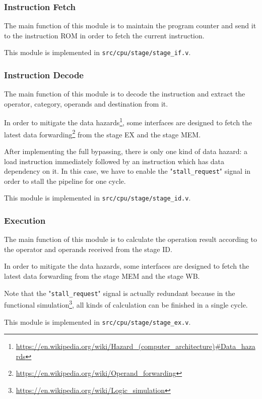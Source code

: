 \documentclass{article}
\begin{document}
\subsubsection{Instruction Fetch}
The main function of this module is to maintain the program counter and send it to the instruction ROM in order to fetch the current instruction.


This module is implemented in \texttt{src/cpu/stage/stage\_if.v}.

\subsubsection{Instruction Decode}
The main function of this module is to decode the instruction and extract the operator, category, operands and destination from it.


In order to mitigate the data hazards\footnote{\url{https://en.wikipedia.org/wiki/Hazard\_(computer\_architecture)\#Data\_hazards}}, some interfaces are designed to fetch the latest data forwarding\footnote{\url{https://en.wikipedia.org/wiki/Operand\_forwarding}} from the stage EX and the stage MEM.

After implementing the full bypassing, there is only one kind of data hazard: a load instruction immediately followed by an instruction which has data dependency on it. In this case, we have to enable the "\texttt{stall\_request}" signal in order to stall the pipeline for one cycle.

This module is implemented in \texttt{src/cpu/stage/stage\_id.v}.

\newpage
\subsubsection{Execution}
The main function of this module is to calculate the operation result according to the operator and operands received from the stage ID.


In order to mitigate the data hazards, some interfaces are designed to fetch the latest data forwarding from the stage MEM and the stage WB.

Note that the "\texttt{stall\_request}" signal is actually redundant because in the functional simulation\footnote{\url{https://en.wikipedia.org/wiki/Logic\_simulation}}, all kinds of calculation can be finished in a single cycle.

This module is implemented in \texttt{src/cpu/stage/stage\_ex.v}.
\end{document}
